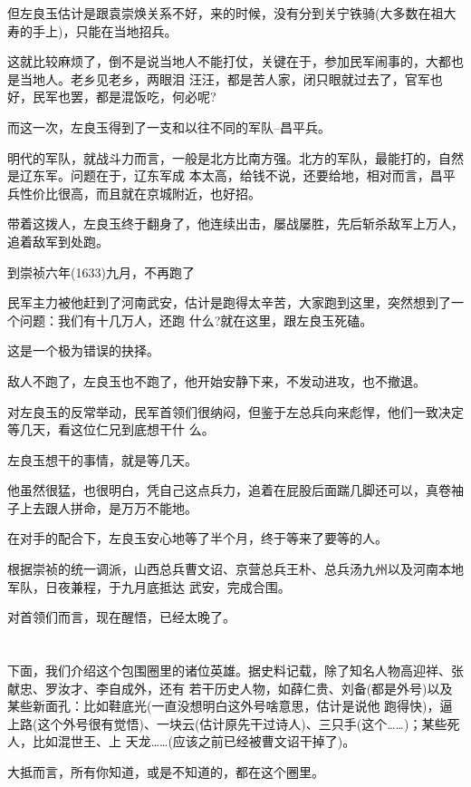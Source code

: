 \documentclass[11pt,a4paper,onecolumn]{article}
\begin{document}
但左良玉估计是跟袁崇焕关系不好，来的时候，没有分到关宁铁骑(大多数在祖大寿的手上)，只能在当地招兵。

这就比较麻烦了，倒不是说当地人不能打仗，关键在于，参加民军闹事的，大都也是当地人。老乡见老乡，两眼泪
汪汪，都是苦人家，闭只眼就过去了，官军也好，民军也罢，都是混饭吃，何必呢?

而这一次，左良玉得到了一支和以往不同的军队--昌平兵。

明代的军队，就战斗力而言，一般是北方比南方强。北方的军队，最能打的，自然是辽东军。问题在于，辽东军成
本太高，给钱不说，还要给地，相对而言，昌平兵性价比很高，而且就在京城附近，也好招。

带着这拨人，左良玉终于翻身了，他连续出击，屡战屡胜，先后斩杀敌军上万人，追着敌军到处跑。

到崇祯六年(1633)九月，不再跑了

民军主力被他赶到了河南武安，估计是跑得太辛苦，大家跑到这里，突然想到了一个问题：我们有十几万人，还跑
什么?就在这里，跟左良玉死磕。

这是一个极为错误的抉择。

敌人不跑了，左良玉也不跑了，他开始安静下来，不发动进攻，也不撤退。

对左良玉的反常举动，民军首领们很纳闷，但鉴于左总兵向来彪悍，他们一致决定等几天，看这位仁兄到底想干什
么。

左良玉想干的事情，就是等几天。

他虽然很猛，也很明白，凭自己这点兵力，追着在屁股后面踹几脚还可以，真卷袖子上去跟人拼命，是万万不能地。

在对手的配合下，左良玉安心地等了半个月，终于等来了要等的人。

根据崇祯的统一调派，山西总兵曹文诏、京营总兵王朴、总兵汤九州以及河南本地军队，日夜兼程，于九月底抵达
武安，完成合围。

对首领们而言，现在醒悟，已经太晚了。

\section[\thesection]{}

下面，我们介绍这个包围圈里的诸位英雄。据史料记载，除了知名人物高迎祥、张献忠、罗汝才、李自成外，还有
若干历史人物，如薛仁贵、刘备(都是外号)以及某些新面孔：比如鞋底光(一直没想明白这外号啥意思，估计是说他
跑得快)，逼上路(这个外号很有觉悟)、一块云(估计原先干过诗人)、三只手(这个……)；某些死人，比如混世王、上
天龙……(应该之前已经被曹文诏干掉了)。

大抵而言，所有你知道，或是不知道的，都在这个圈里。
\end{document}
